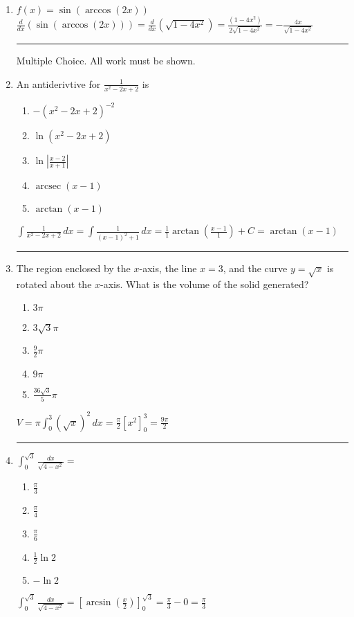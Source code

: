 \documentclass[10pt, letterpaper]{report}
\DeclareMathOperator{\arcsec}{arcsec}
\begin{document}
\begin{enumerate}
  \item{$f(x)=\sin{\left(\arccos{(2x)}\right)}$} \\
  
    $\frac{d}{dx}\left(\sin\left(\arccos{(2x)}\right)\right)=
    \frac{d}{dx}\left(\sqrt{1-4x^{2}}\right)=
    \frac{\left(1-4x^{2}\right)}{2\sqrt{1-4x^{2}}}=
    -\frac{4x}{\sqrt{1-4x^{2}}}$ \\
    
  \hrule
  \noindent Multiple Choice. All work must be shown. \\
  \item{An antiderivtive for $\frac{1}{x^{2}-2x+2}$ is} 
  \begin{enumerate}
    \item{$-\left(x^{2}-2x+2\right)^{-2}$}
    \item{$\ln{(x^{2}-2x+2)}$}
    \item{$\ln{|\frac{x-2}{x+1}|}$}
    \item{$\arcsec{(x-1)}$}
    \item{$\arctan{(x-1)}$} \\
  \end{enumerate}
  
    $\int{\frac{1}{x^{2}-2x+2}}\,dx=
    \int{\frac{1}{\left(x-1\right)^{2}+1}}\,dx=
    \frac{1}{1}\arctan{\left(\frac{x-1}{1}\right)}+C=
    \arctan{\left(x-1\right)}$ \\
    
  \hrule
  \item{The region enclosed by the $x$-axis, the line $x=3$, and the curve $y=\sqrt{x}$ is rotated about the $x$-axis. What is the volume of the solid generated? }
  \begin{enumerate}
    \item{$3\pi$}
    \item{$3\sqrt{3}\pi$}
    \item{$\frac{9}{2}\pi$}
    \item{$9\pi$}
    \item{$\frac{36\sqrt{3}}{5}\pi$}
  \end{enumerate}
  
    $V=\pi\int_{0}^{3}{\left(\sqrt{x}\right)^{2}}\,dx=
    \frac{\pi}{2}[x^{2}]_{0}^{3}=\frac{9\pi}{2}$ \\
    
  \hrule
  \item{$\int_{0}^{\sqrt{3}}{\frac{dx}{\sqrt{4-x^{2}}}}=$}
  \begin{enumerate}
    \item{$\frac{\pi}{3}$}
    \item{$\frac{\pi}{4}$}
    \item{$\frac{\pi}{6}$}
    \item{$\frac{1}{2}\ln{2}$}
    \item{$-\ln{2}$} \\
  \end{enumerate}
  
    $\int_{0}^{\sqrt{3}}{\frac{dx}{\sqrt{4-x^{2}}}}=
    [\arcsin{\left(\frac{x}{2}\right)}]_{0}^{\sqrt{3}}=
    \frac{\pi}{3}-0=\frac{\pi}{3}$ \\
\end{enumerate}
\end{document}

